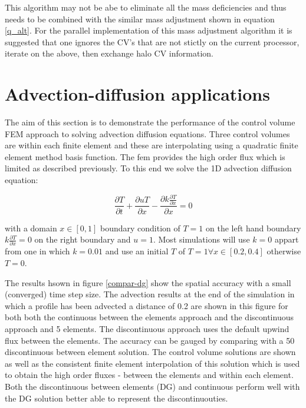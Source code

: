 This algorithm may not be abe to eliminate all the mass deficiencies and 
thus needs to be combined with the 
similar mass adjustment shown in equation \ref{q_alt}. 
For the parallel implementation of this mass adjustment algorithm it is suggested that 
one ignores the CV's that are not stictly on the current processor, iterate on the above, then exchange halo CV information.  


\pagebreak


\section{Advection-diffusion applications}
\label{Advection-diffusion applications} 

The aim of this section is to demonstrate the performance of the 
control volume FEM approach to solving advection diffusion equations. 
Three control volumes are within each finite element 
and these are interpolating using a quadratic finite element 
method basis function. The fem provides the high order 
flux which is limited as described previously.  
To this end we solve the 1D advection diffusion equation:

\begin{equation} 
\frac{\partial T}{\partial t} + \frac{\partial u T}{\partial x} 
- \frac{\partial k \frac{\partial T }{\partial x}}{\partial x} =0
\end{equation}

with a domain $x\in \left[0,1\right]$ boundary condition of $T=1$ on the left hand boundary 
$k\frac{\partial T }{\partial x}=0$ on the right boundary and $u=1$. 
Most simulations will use $k=0$ appart from one in which $k=0.01$ 
and use an initial $T$ of $T=1 \forall x\in \left[ 0.2, 0.4 \right]$ 
otherwise $T=0$.  

The results hsown in figure \ref{compar-dg} show the spatial accuracy 
with a small (converged) time step size. The advection results at 
the end of the simulation in which a profile has been advected a distance 
of 0.2 are shown in this figure for both both the continuous between 
the elements approach and the discontinuous approach and 5 elements. 
The discontinuous approach uses the default upwind flux between 
the elements. The accuracy can be gauged by comparing with a 50 
discontinuous between element solution. 
The control volume solutions are shown as well as the consistent finite 
element interpolation of this solution which is used to obtain the 
high order fluxes - between the elements and within each element. 
Both the discontinuous between elements (DG) and continuous 
perform well with the DG solution better able to represent 
the discontinuouties. 

